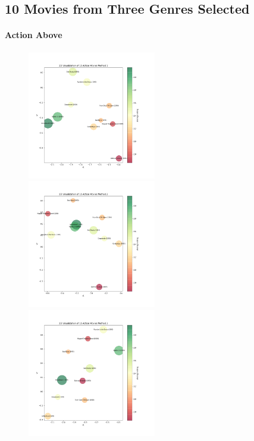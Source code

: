\documentclass{article}
\begin{document}
\newpage


\subsection{10 Movies from Three Genres Selected}


\paragraph{Action Above}
\begin{figure}[H]
\includegraphics[width=0.5\textwidth]{matrixfactorization/2D Visualization of 10 Action Movies Method 1.png}
\includegraphics[width=0.5\textwidth]{matrixfactorization/2D Visualization of 10 Action Movies Method 2.png}
\includegraphics[width=0.5\textwidth]{matrixfactorization/2D Visualization of 10 Action Movies Method 3.png}
\end{figure}
\end{document}
